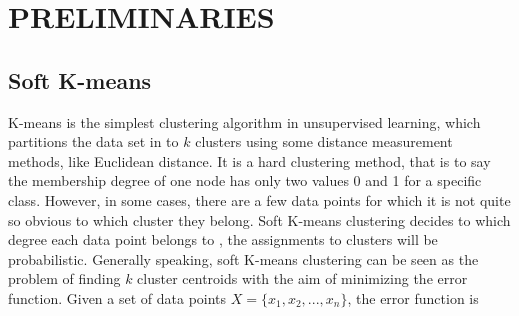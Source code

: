 \documentclass[journal,twoside,web]{ieeecolor}
\begin{document}
\section{PRELIMINARIES}

\subsection{Soft K-means}

K-means is the simplest clustering algorithm in unsupervised learning, which partitions the data set in to $k$ clusters using some distance measurement methods, like Euclidean distance. It is a hard clustering method, that is to say the membership degree of one node has only two values 0 and 1 for a specific class. However, in some cases, there are a few data points for which it is not quite so obvious to which cluster they belong. Soft K-means clustering decides to which degree each data point belongs to , the assignments to clusters will be probabilistic. Generally speaking, soft K-means clustering can be seen as the problem of finding $k$ cluster centroids with the aim of minimizing the error function. Given a set of data points $X = \{x_1,x_2,...,x_n\}$, the error function is
\end{document}
